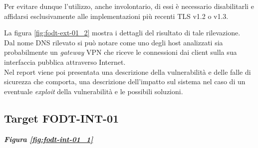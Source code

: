 \documentclass[target=bach,aauheader=]{thud}
\begin{document}
Per evitare dunque l'utilizzo, anche involontario, di essi è necessario disabilitarli e affidarsi esclusivamente alle implementazioni più recenti TLS v1.2 o v1.3.

La figura \ref{fig:fodt-ext-01_2} mostra i dettagli del risultato di tale rilevazione.
\\ Dal nome DNS rilevato si può notare come uno degli host analizzati sia probabilmente un \textit{gateway} VPN che riceve le connessioni dai client sulla sua interfaccia pubblica attraverso Internet. 
\\ Nel report viene poi presentata una descrizione della vulnerabilità e delle falle di sicurezza che comporta, una descrizione dell'impatto sul sistema nel caso di un eventuale \textit{exploit} della vulnerabilità e le possibili soluzioni.

\subsection{Target FODT-INT-01} \textbf{\textit{Figura \ref{fig:fodt-int-01_1}}}
\end{document}
